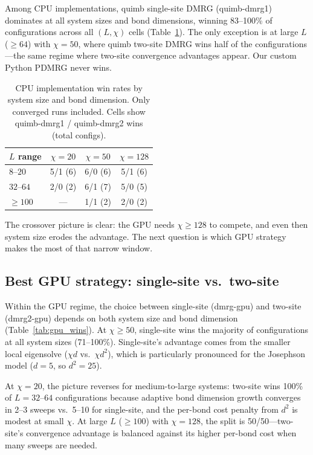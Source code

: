 \documentclass[preprint,12pt]{elsarticle}
\begin{document}
Among CPU implementations, quimb single-site DMRG (quimb-dmrg1) dominates at all system sizes and bond dimensions, winning 83--100\% of configurations across all $(L, \chi)$ cells (Table~\ref{tab:cpu_wins}).
The only exception is at large $L$ ($\geq 64$) with $\chi = 50$, where quimb two-site DMRG wins half of the configurations---the same regime where two-site convergence advantages appear.
Our custom Python PDMRG never wins.

\begin{table}[h]
\centering
\caption{CPU implementation win rates by system size and bond dimension.  Only converged runs included.  Cells show quimb-dmrg1 / quimb-dmrg2 wins (total configs).}
\label{tab:cpu_wins}
\begin{tabular}{lccc}
\toprule
$L$ range & $\chi = 20$ & $\chi = 50$ & $\chi = 128$ \\
\midrule
$8$--$20$   & 5/1 (6)  & 6/0 (6)  & 5/1 (6) \\
$32$--$64$  & 2/0 (2)  & 6/1 (7)  & 5/0 (5) \\
$\geq 100$  & ---      & 1/1 (2)  & 2/0 (2) \\
\bottomrule
\end{tabular}
\end{table}

The crossover picture is clear: the GPU needs $\chi \geq 128$ to compete, and even then system size erodes the advantage.  The next question is which GPU strategy makes the most of that narrow window.

\subsection{Best GPU strategy: single-site vs.\ two-site}
\label{sec:single_vs_two}

Within the GPU regime, the choice between single-site (dmrg-gpu) and two-site (dmrg2-gpu) depends on both system size and bond dimension (Table~\ref{tab:gpu_wins}).
At $\chi \geq 50$, single-site wins the majority of configurations at all system sizes (71--100\%).
Single-site's advantage comes from the smaller local eigensolve ($\chi d$ vs.\ $\chi d^2$), which is particularly pronounced for the Josephson model ($d = 5$, so $d^2 = 25$).

At $\chi = 20$, the picture reverses for medium-to-large systems: two-site wins 100\% of $L = 32$--$64$ configurations because adaptive bond dimension growth converges in 2--3 sweeps vs.\ 5--10 for single-site, and the per-bond cost penalty from $d^2$ is modest at small $\chi$.
At large $L$ ($\geq 100$) with $\chi = 128$, the split is 50/50---two-site's convergence advantage is balanced against its higher per-bond cost when many sweeps are needed.
\end{document}
